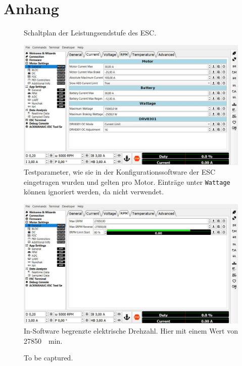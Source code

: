 \appendix
\chapter{Anhang}
	\begin{figure}[h]
		\centering
		
		\caption[Schaltplan der Leistungsendstufe des ESC]{Schaltplan der Leistungsendstufe des ESC\cite{vesc.documentation.2015}.}%
		\label{fig:power mosfets}
	\end{figure}
	\newpage
	\begin{figure}[t]
		\centering
		\includegraphics[width=\textwidth]{Assets/ESC_Motor_Parameters.jpg}
		\caption[Testparameter, wie sie in der Konfigurationssoftware der ESC eingetragen wurden]{Testparameter, wie sie in der Konfigurationssoftware der ESC eingetragen wurden und gelten pro Motor. Einträge unter \texttt{Wattage} können ignoriert werden, da nicht verwendet.}%
		\label{fig:ESC motor params}
	\end{figure}
	\begin{figure}[b]
		\centering
		\includegraphics[width=\textwidth]{Assets/ESC_erpm.jpg}
		\caption[In-Software begrenzte elektrische Drehzahl]{In-Software begrenzte elektrische Drehzahl. Hier mit einem Wert von \qty{27850}{\per\minute}.}%
		\label{fig:ESC erpm setting}
	\end{figure}
	\newpage
	\begin{figure}[h]
		\centering
		
		\caption[]{To be captured.}%
		\label{fig:esc testdrive plot}
	\end{figure}